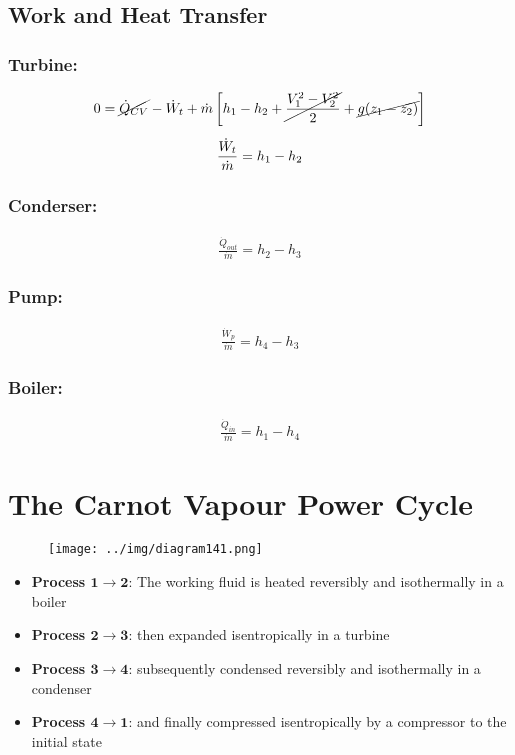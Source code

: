 \documentclass[class=report, crop=false, 12pt,a4paper]{standalone}
\numberwithin{equation}{section}
\begin{document}
\subsection{Work and Heat Transfer}
\subsubsection{Turbine:}
\begin{gather}
  0 = \cancel{\dot{Q}_{CV}} - \dot{W}_t + \dot{m}\left[h_1 - h_2 + \cancel{\frac{V_1^2-V_2^2}{2}} + \cancel{g(z_1-z_2)}\right] \\[5pt]
  \frac{\dot{W}_t}{\dot{m}} = h_1 - h_2
\end{gather}
\subsubsection{Conderser:}
\begin{gather}
  \frac{\dot{Q}_{out}}{\dot{m}} = h_2-h_3
\end{gather}
\subsubsection{Pump:}
\begin{gather}
  \frac{\dot{W}_p}{\dot{m}} = h_4-h_3
\end{gather}
\subsubsection{Boiler:}
\begin{gather}
  \frac{\dot{Q}_{in}}{\dot{m}} = h_1-h_4
\end{gather}
\section{The Carnot Vapour Power Cycle}
\begin{figure}[H]
  \centering
  \texttt{[image: ../img/diagram141.png]}
  \caption{}
\end{figure}
\begin{itemize}[noitemsep]
  \item \textbf{Process $\mathbf{1\rightarrow 2}$}: The working fluid is heated reversibly and isothermally in a boiler
  \item \textbf{Process $\mathbf{2\rightarrow 3}$}: then expanded isentropically in a turbine
  \item \textbf{Process $\mathbf{3\rightarrow 4}$}: subsequently condensed reversibly and isothermally in a condenser
  \item \textbf{Process $\mathbf{4\rightarrow 1}$}: and finally compressed isentropically by a compressor to the initial state
\end{itemize}
\end{document}
